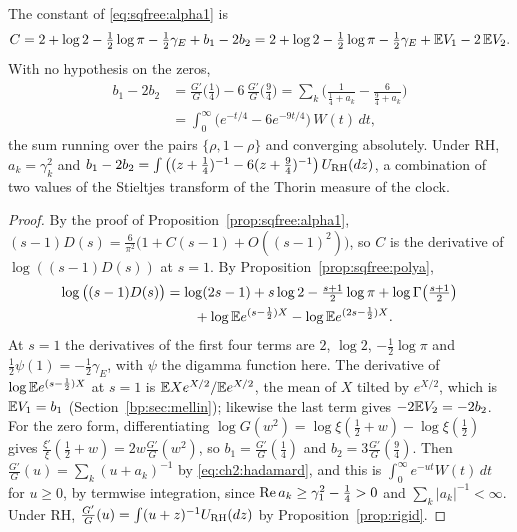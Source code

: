 \begin{theorem}\label{thm:sqfree:const}
The constant of \eqref{eq:sqfree:alpha1} is
\[
C=2+\log2-\tfrac12\log\pi-\tfrac12\gamma_E+b_1-2b_2=2+\log2-\tfrac12\log\pi-\tfrac12\gamma_E+\mathbb{E} V_1-2\,\mathbb{E} V_2 .
\]
With no hypothesis on the zeros,
\begin{equation}\label{eq:sqfree:zeropart}
\begin{split}
b_1-2b_2&=\frac{G'}G\Big(\frac14\Big)-6\,\frac{G'}G\Big(\frac94\Big)=\sum_k\Big(\frac1{\frac14+a_k}-\frac6{\frac94+a_k}\Big)\\
&=\int_0^\infty\big(e^{-t/4}-6e^{-9t/4}\big)\,W(t)\,dt,
\end{split}
\end{equation}
the sum running over the pairs $\{\rho,1-\rho\}$ and converging absolutely. Under RH, $a_k=\gamma_k^2$ and $b_1-2b_2=\int\big((z+\frac14)^{-1}-6(z+\frac94)^{-1}\big)\,U_{\mathrm{RH}}(dz)$, a combination of two values of the Stieltjes transform of the Thorin measure of the clock.
\end{theorem}

\begin{proof}
By the proof of Proposition~\ref{prop:sqfree:alpha1}, $(s-1)D(s)=\frac6{\pi^2}\big(1+C(s-1)+O((s-1)^2)\big)$, so $C$ is the derivative of $\log((s-1)D(s))$ at $s=1$. By Proposition~\ref{prop:sqfree:polya},
\begin{align*}
\log\big((s-1)D(s)\big)&=\log(2s-1)+s\log2-\tfrac{s+1}2\log\pi+\log\Gamma\big(\tfrac{s+1}2\big)\\
&\qquad+\log\mathbb{E} e^{(s-\frac12)X}-\log\mathbb{E} e^{(2s-\frac12)X}.
\end{align*}
At $s=1$ the derivatives of the first four terms are $2$, $\log2$, $-\frac12\log\pi$ and $\frac12\psi(1)=-\frac12\gamma_E$, with $\psi$ the digamma function here. The derivative of $\log\mathbb{E} e^{(s-\frac12)X}$ at $s=1$ is $\mathbb{E} Xe^{X/2}/\mathbb{E} e^{X/2}$, the mean of $X$ tilted by $e^{X/2}$, which is $\mathbb{E} V_1=b_1$ (Section~\ref{bp:sec:mellin}); likewise the last term gives $-2\mathbb{E} V_2=-2b_2$. For the zero form, differentiating $\log G(w^2)=\log\xi(\frac12+w)-\log\xi(\frac12)$ gives $\frac{\xi'}\xi(\frac12+w)=2w\frac{G'}G(w^2)$, so $b_1=\frac{G'}G(\frac14)$ and $b_2=3\frac{G'}G(\frac94)$. Then $\frac{G'}G(u)=\sum_k(u+a_k)^{-1}$ by \eqref{eq:ch2:hadamard}, and this is $\int_0^\infty e^{-ut}W(t)\,dt$ for $u\ge0$, by termwise integration, since $\operatorname{Re} a_k\ge\gamma_1^2-\frac14>0$ and $\sum_k|a_k|^{-1}<\infty$. Under RH, $\frac{G'}G(u)=\int(u+z)^{-1}U_{\mathrm{RH}}(dz)$ by Proposition~\ref{prop:rigid}.
\end{proof}

